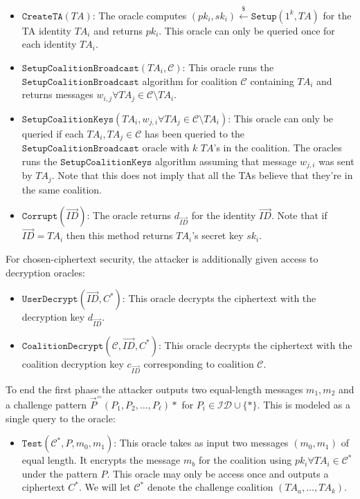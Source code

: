 \documentclass[10pt]{llncs}
\newcommand{\C}{\mathcal{C}}
\newcommand{\ID}{\mathit{ID}}
\newcommand{\TA}{\mathit{TA}}
\newcommand{\getsr}{\stackrel{{\scriptscriptstyle\$}}{\gets}}
\begin{document}
\begin{itemize}
\item $\texttt{CreateTA}(\TA)$: The oracle computes $(pk_i,sk_i)\getsr \texttt{Setup}(1^{k},\TA)$ for the TA identity $\TA_i$ and returns $pk_i$. This oracle can only be queried once for each identity $\TA_i$.
\medskip

\item $\texttt{SetupCoalitionBroadcast}(\TA_i,\C)$: This oracle runs the $\texttt{SetupCoalitionBroadcast}$ algorithm for coalition $\C$ containing $\TA_i$ and returns messages $w_{i,j} \forall \TA_j \in \C \setminus \TA_i$.
\medskip

\item $\texttt{SetupCoalitionKeys}(\TA_i, w_{j,i}\forall \TA_j \in \C \setminus \TA_i)$: This oracle can only be queried if each $\TA_i, \TA_j \in \C$ has been queried to the $\texttt{SetupCoalitionBroadcast}$ oracle with $k$ $\TA$'s in the coalition. The oracles runs the $\texttt{SetupCoalitionKeys}$ algorithm assuming that message $w_{j,i}$ was sent by $\TA_{j}$. Note that this does not imply that all the TAs believe that they're in the same coalition.
\medskip

\item $\texttt{Corrupt}(\vec{\ID})$: The oracle returns $d_{\vec{\ID}}$ for the identity $\vec{\ID}$.  Note that if $\vec{\ID} = TA_i$ then this method returns $\TA_i$'s secret key $sk_i$.
\end{itemize}

For chosen-ciphertext security, the attacker is additionally given access to decryption oracles:

\begin{itemize}
	\item $\texttt{UserDecrypt}(\vec{\ID},C^{*})$: This oracle decrypts the ciphertext with the decryption key $d_{\vec{\ID}}$.
	\medskip

	\item $\texttt{CoalitionDecrypt}(\C,\vec{\ID},C^{*})$: This oracle decrypts the ciphertext with the coalition decryption key $c_{\vec{\ID}}$ corresponding to coalition $\C$.
\end{itemize}

To end the first phase the attacker outputs two equal-length messages $m_1, m_2$ and a challenge pattern $\vec{\mathit{P}}^ = (P_1, P_2, \ldots, P_\ell)*$ for $P_i \in \mathcal{ID} \cup \{*\}$. This is modeled as a single query to the oracle:

\begin{itemize}
\item $\texttt{Test}(\C^*,\mathit{P},m_{0},m_{1})$: This oracle takes as input two messages $(m_{0},m_{1})$ of equal length. It encrypts the message $m_{b}$ for the coalition using $pk_i \forall \TA_i \in \C^*$ under the pattern $\mathit{P}$. This oracle may only be access once and outputs a ciphertext $C^{*}$. We will let $\C^*$ denote the challenge coalition $(\TA_{a},\ldots,\TA_{k})$.
\end{itemize}
\end{document}
